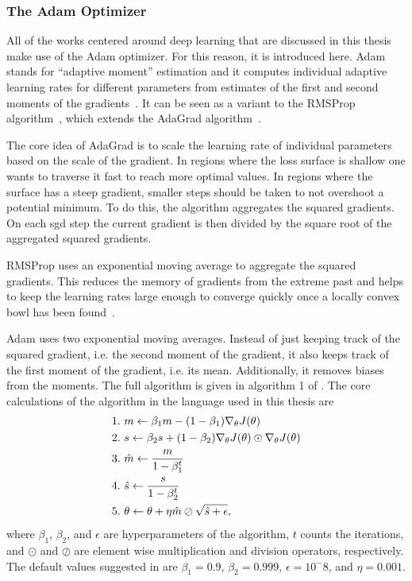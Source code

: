 \subsubsection{The Adam Optimizer}
All of the works centered around deep learning that are discussed in this thesis make use of the Adam optimizer. For this reason, it is introduced here. Adam stands for ``adaptive moment'' estimation and it computes individual adaptive learning rates for different parameters from estimates of the first and second moments of the gradients~\cite{Kingma:2014aaa}. It can be seen as a variant to the RMSProp algorithm~\cite{Goodfellow:2016:DNN,Tieleman:2012aaa}, which extends the AdaGrad algorithm~\cite{Duchi:2011aaa}.

The core idea of AdaGrad is to scale the learning rate of individual parameters based on the scale of the gradient. In regions where the loss surface is shallow one wants to traverse it fast to reach more optimal values. In regions where the surface has a steep gradient, smaller steps should be taken to not overshoot a potential minimum. To do this, the algorithm aggregates the squared gradients. On each \acrshort{sgd} step the current gradient is then divided by the square root of the aggregated squared gradients.

RMSProp uses an exponential moving average to aggregate the squared gradients. This reduces the memory of gradients from the extreme past and helps to keep the learning rates large enough to converge quickly once a locally convex bowl has been found~\cite{Goodfellow:2016:DNN}. %

Adam uses two exponential moving averages. Instead of just keeping track of the squared gradient, i.e. the second moment of the gradient, it also keeps track of the first moment of the gradient, i.e. its mean. Additionally, it removes biases from the moments. The full algorithm is given in algorithm 1 of \cite{Kingma:2014aaa}. The core calculations of the algorithm in the language used in this thesis are~\cite{Geron:2017aaa}%
\begin{align}
1.\ & m \leftarrow \beta_1 m - {\left( 1 - \beta_1 \right)}\nabla_\theta J{\left( \theta \right)}\nonumber\\
2.\ & s \leftarrow \beta_2 s + {\left( 1 - \beta_2 \right)}\nabla_\theta J{\left( \theta \right)}\odot\nabla_\theta J{\left( \theta \right)}\nonumber\\
3.\ & \hat{m} \leftarrow \frac{m}{1 - \beta_1^t}\nonumber\\
4.\ & \hat{s} \leftarrow \frac{s}{1 - \beta_2^t}\nonumber\\
5.\ & \theta \leftarrow \theta + \eta\hat{m}\oslash \sqrt{\hat{s}+\epsilon},
\end{align}
where $\beta_1$, $\beta_2$, and $\epsilon$ are hyperparameters of the algorithm, $t$ counts the iterations, and $\odot$ and $\oslash$ are element wise multiplication and division operators, respectively. The default values suggested in \cite{Kingma:2014aaa} are $\beta_1 = 0.9$, $\beta_2 = 0.999$, $\epsilon = 10^-8$, and $\eta = 0.001$.

